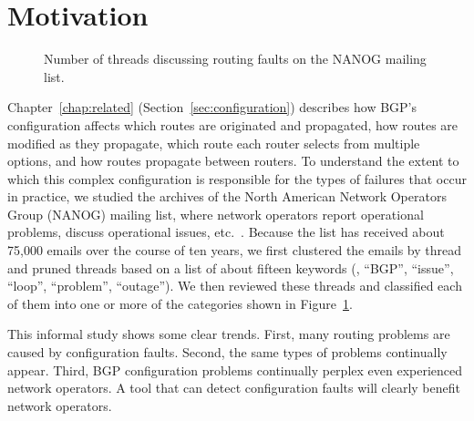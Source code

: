 \section{Motivation}
\label{s:background}
\label{s:nanogproblems}




\begin{figure}[t]
\begin{center}
\centering{}
\end{center}
\caption{Number of threads discussing routing
  faults on the NANOG mailing list.
}
\label{tab:nanogerrors}
\end{figure}


Chapter~\ref{chap:related} (Section~\ref{sec:configuration})
describes how BGP's configuration affects which routes are originated
and propagated, how routes are modified as they propagate, which route
each router selects from multiple options, and how routes propagate
between routers.  
To understand the extent to which this complex configuration is
responsible for the types of failures that occur in practice, we studied
the archives of the North American Network Operators Group (NANOG)
mailing list, where network operators report operational problems,
discuss operational issues, etc.~\cite{nanog-list}.  Because the list
has received about 75,000 emails over the course of ten years, we first
clustered the emails by thread and pruned threads based on a list of
about fifteen keywords (\eg, ``BGP'', ``issue'', ``loop'', ``problem'',
``outage'').  We then reviewed these threads and classified each of them
into one or more of the categories shown in
Figure~\ref{tab:nanogerrors}.

This informal study shows some clear trends.  First, many routing
problems are caused by configuration faults.  Second, the same
types of problems continually appear.  Third, BGP
configuration problems continually perplex even experienced network
operators.  A tool that can detect configuration faults will clearly
benefit network operators.
